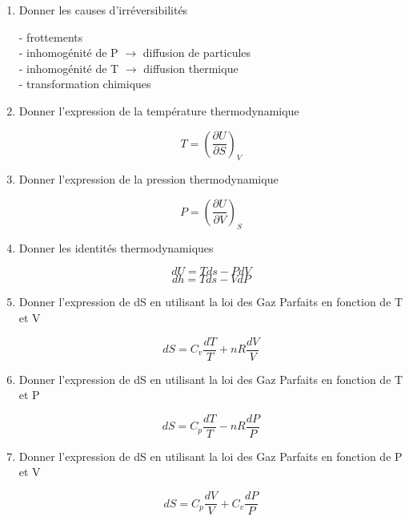 \begin{enumerate}[label=\arabic{enumi} - , left=0pt, itemsep=1em]
    \item Donner les causes d'irréversibilités \par
    \begin{solution}
        - frottements \\
        - inhomogénité de P $\rightarrow$ diffusion de particules \\
        - inhomogénité de T $\rightarrow$ diffusion thermique \\
        - transformation chimiques
    \end{solution}

    \item Donner l'expression de la température thermodynamique \par
    \begin{solution}
        \[ T = (\frac{\partial U}{\partial S})_V\]
    \end{solution}

    \item Donner l'expression de la pression thermodynamique \par
    \begin{solution}
        \[ P = (\frac{\partial U}{\partial V})_S\]
    \end{solution}

    \item Donner les identités thermodynamiques\par
    \begin{solution}
        \[ dU = Tds - PdV\]
        \[ dh = Tds - VdP\]
    \end{solution}

    \item Donner l'expression de dS en utilisant la loi des Gaz Parfaits en fonction de T et V \par
    \begin{solution}
        \[ dS = C_v \frac{dT}{T} + nR\frac{dV}{V}\]
    \end{solution}

    \item Donner l'expression de dS en utilisant la loi des Gaz Parfaits en fonction de T et P \par
    \begin{solution}
        \[ dS = C_p \frac{dT}{T} - nR\frac{dP}{P}\]
    \end{solution}
    
    \item Donner l'expression de dS en utilisant la loi des Gaz Parfaits en fonction de P et V \par
    \begin{solution}
        \[ dS = C_p \frac{dV}{V} + C_v\frac{dP}{P}\]
    \end{solution}


\end{enumerate}
